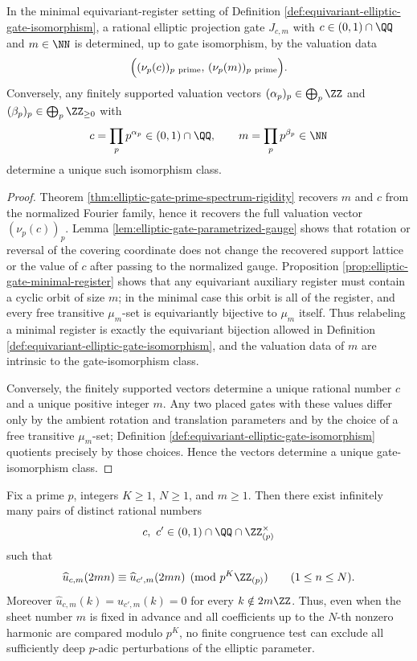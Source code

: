 \begin{corollary}\label{cor:elliptic-gate-prime-spectrum-classification}
In the minimal equivariant-register setting of Definition \ref{def:equivariant-elliptic-gate-isomorphism}, a rational elliptic projection gate \(J_{c,m}\) with \(c\in(0,1)\cap\QQ\) and \(m\in\NN\) is determined, up to gate isomorphism, by the valuation data
\[
\Bigl((\nu_p(c))_{p\ \mathrm{prime}},\,(\nu_p(m))_{p\ \mathrm{prime}}\Bigr).
\]
Conversely, any finitely supported valuation vectors \((\alpha_p)_p\in\bigoplus_p\ZZ\) and \((\beta_p)_p\in\bigoplus_p\ZZ_{\ge0}\) with
\[
c=\prod_p p^{\alpha_p}\in(0,1)\cap\QQ,
\qquad
m=\prod_p p^{\beta_p}\in\NN
\]
determine a unique such isomorphism class.
\end{corollary}

\begin{proof}
Theorem \ref{thm:elliptic-gate-prime-spectrum-rigidity} recovers \(m\) and \(c\) from the normalized Fourier family, hence it recovers the full valuation vector \((\nu_p(c))_p\). Lemma \ref{lem:elliptic-gate-parametrized-gauge} shows that rotation or reversal of the covering coordinate does not change the recovered support lattice or the value of \(c\) after passing to the normalized gauge. Proposition \ref{prop:elliptic-gate-minimal-register} shows that any equivariant auxiliary register must contain a cyclic orbit of size \(m\); in the minimal case this orbit is all of the register, and every free transitive \(\mu_m\)-set is equivariantly bijective to \(\mu_m\) itself. Thus relabeling a minimal register is exactly the equivariant bijection allowed in Definition \ref{def:equivariant-elliptic-gate-isomorphism}, and the valuation data of \(m\) are intrinsic to the gate-isomorphism class.

Conversely, the finitely supported vectors determine a unique rational number \(c\) and a unique positive integer \(m\). Any two placed gates with these values differ only by the ambient rotation and translation parameters and by the choice of a free transitive \(\mu_m\)-set; Definition \ref{def:equivariant-elliptic-gate-isomorphism} quotients precisely by those choices. Hence the vectors determine a unique gate-isomorphism class.
\end{proof}

\begin{theorem}\label{thm:elliptic-gate-padics-obstruction}
Fix a prime \(p\), integers \(K\ge 1\), \(N\ge 1\), and \(m\ge 1\). Then there exist infinitely many pairs of distinct rational numbers
\[
c,\ c'\in (0,1)\cap\QQ\cap\ZZ_{(p)}^\times
\]
such that
\[
\widehat u_{c,m}(2mn)\equiv \widehat u_{c',m}(2mn)\pmod{p^K\ZZ_{(p)}}
\qquad (1\le n\le N).
\]
Moreover \(\widehat u_{c,m}(k)=\widehat u_{c',m}(k)=0\) for every \(k\notin 2m\ZZ\). Thus, even when the sheet number \(m\) is fixed in advance and all coefficients up to the \(N\)-th nonzero harmonic are compared modulo \(p^K\), no finite congruence test can exclude all sufficiently deep \(p\)-adic perturbations of the elliptic parameter.
\end{theorem}

